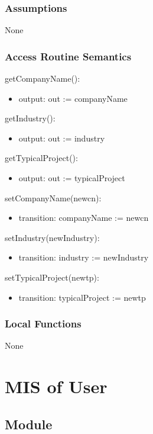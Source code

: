 \documentclass[12pt, titlepage]{article}
\begin{document}
\subsubsection{Assumptions}
None

\subsubsection{Access Routine Semantics}

\noindent getCompanyName():
\begin{itemize}
\item output: out := companyName
\end{itemize}

\noindent getIndustry():
\begin{itemize}
\item output: out := industry
\end{itemize}

\noindent getTypicalProject():
\begin{itemize}
\item output: out := typicalProject
\end{itemize}

\noindent setCompanyName(newcn):
\begin{itemize}
\item transition: companyName := newcn 
\end{itemize}

\noindent setIndustry(newIndustry):
\begin{itemize}
\item transition: industry := newIndustry
\end{itemize}

\noindent setTypicalProject(newtp):
\begin{itemize}
\item transition: typicalProject := newtp 
\end{itemize}

\subsubsection{Local Functions}
None

\section{MIS of User} \label{user}

\subsection{Module}
\end{document}
